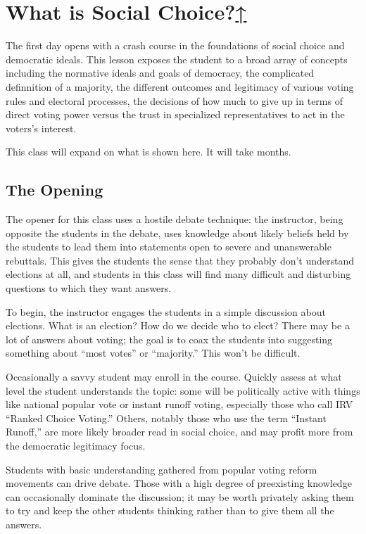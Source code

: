 
\label{cur:what-is-sc}
\section{What is Social Choice?\hyperref[syllabus]{↑}}

The first day opens with a crash course in the foundations of social choice and democratic ideals.  This lesson exposes the student to a broad array of concepts including the normative ideals and goals of democracy, the complicated definnition of a majority, the different outcomes and legitimacy of various voting rules and electoral processes, the decisions of how much to give up in terms of direct voting power versus the trust in specialized representatives to act in the voters's interest.

This class will expand on what is shown here.  It will take months.
\subsection{The Opening}

The opener for this class uses a hostile debate technique:  the instructor, being opposite the students in the debate, uses knowledge about likely beliefs held by the students to lead them into statements open to severe and unanswerable rebuttals.  This gives the students the sense that they probably don't understand elections at all, and students in this class will find many difficult and disturbing questions to which they want answers.

To begin, the instructor engages the students in a simple discussion about elections.  What is an election?  How do we decide who to elect?  There may be a lot of answers about voting; the goal is to coax the students into suggesting something about ``most votes'' or ``majority.''  This won't be difficult.

\begin{boxcomment}
    Occasionally a savvy student may enroll in the course.  Quickly assess at what level the student understands the topic:  some will be politically active with things like national popular vote or instant runoff voting, especially those who call IRV ``Ranked Choice Voting.''  Others, notably those who use the term ``Instant Runoff,'' are more likely broader read in social choice, and may profit more from the democratic legitimacy focus.

    Students with basic understanding gathered from popular voting reform movements can drive debate.  Those with a high degree of preexisting knowledge can occasionally dominate the discussion; it may be worth privately asking them to try and keep the other students thinking rather than to give them all the answers.
\end{boxcomment}

